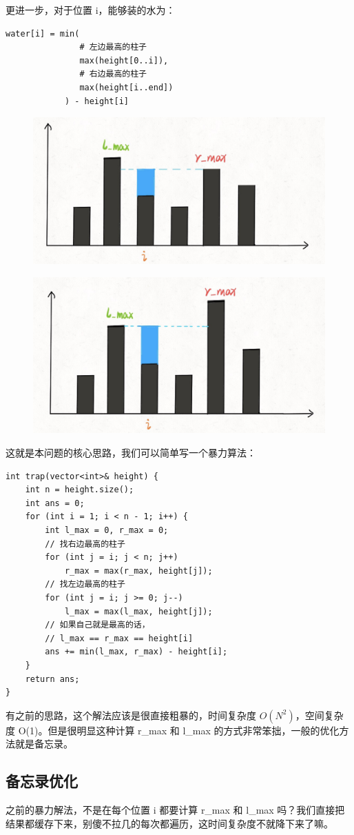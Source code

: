 \documentclass[12pt]{article}
\begin{document}
更进一步，对于位置 i，能够装的水为：
\begin{lstlisting}
water[i] = min(
               # 左边最高的柱子
               max(height[0..i]),  
               # 右边最高的柱子
               max(height[i..end]) 
            ) - height[i]
\end{lstlisting}
\begin{figure}[H]
    \centering
    \includegraphics[width=.6\textwidth]{fig/Receive_Rainwater_3.png}
\end{figure}
\begin{figure}[H]
    \centering
    \includegraphics[width=.6\textwidth]{fig/Receive_Rainwater_4.png}
\end{figure}

这就是本问题的核心思路，我们可以简单写一个暴力算法：
\begin{lstlisting}
int trap(vector<int>& height) {
    int n = height.size();
    int ans = 0;
    for (int i = 1; i < n - 1; i++) {
        int l_max = 0, r_max = 0;
        // 找右边最高的柱子
        for (int j = i; j < n; j++)
            r_max = max(r_max, height[j]);
        // 找左边最高的柱子
        for (int j = i; j >= 0; j--)
            l_max = max(l_max, height[j]);
        // 如果自己就是最高的话，
        // l_max == r_max == height[i]
        ans += min(l_max, r_max) - height[i];
    }
    return ans;
}
\end{lstlisting}

有之前的思路，这个解法应该是很直接粗暴的，时间复杂度 $O(N^2)$，空间复杂度 O(1)。但是很明显这种计算 r\_max 和 l\_max 的方式非常笨拙，一般的优化方法就是备忘录。

\subsection{备忘录优化}
之前的暴力解法，不是在每个位置 i 都要计算 r\_max 和 l\_max 吗？我们直接把结果都缓存下来，别傻不拉几的每次都遍历，这时间复杂度不就降下来了嘛。
\end{document}
